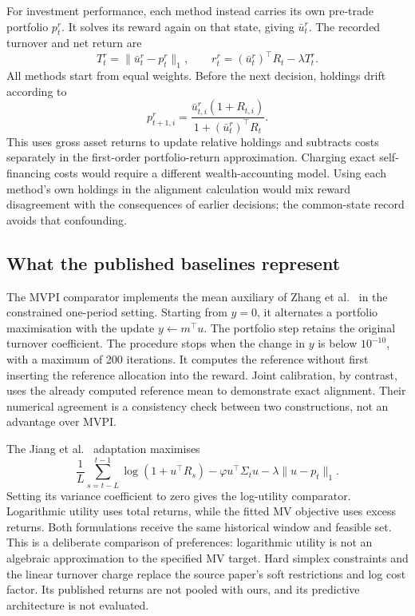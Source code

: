 \documentclass[sigconf,review]{acmart}
\begin{document}
For investment performance, each method instead carries its own pre-trade portfolio $p_t^r$. It solves its reward again on that state, giving $\bar u_t^r$. The recorded turnover and net return are
\begin{equation}
 T_t^r=\|\bar u_t^r-p_t^r\|_1,\qquad
 r_t^r=(\bar u_t^r)^\top R_t-\lambda T_t^r.
\end{equation}
All methods start from equal weights. Before the next decision, holdings drift according to
\begin{equation}
 p_{t+1,i}^r=
 \frac{\bar u_{t,i}^r(1+R_{t,i})}{1+(\bar u_t^r)^\top R_t}.
\end{equation}
This uses gross asset returns to update relative holdings and subtracts costs separately in the first-order portfolio-return approximation. Charging exact self-financing costs would require a different wealth-accounting model. Using each method's own holdings in the alignment calculation would mix reward disagreement with the consequences of earlier decisions; the common-state record avoids that confounding.

\subsection{What the published baselines represent}
The MVPI comparator implements the mean auxiliary of Zhang et al.\ \cite{zhang2021} in the constrained one-period setting. Starting from $y=0$, it alternates a portfolio maximisation with the update $y\leftarrow m^\top u$. The portfolio step retains the original turnover coefficient. The procedure stops when the change in $y$ is below $10^{-10}$, with a maximum of 200 iterations. It computes the reference without first inserting the reference allocation into the reward. Joint calibration, by contrast, uses the already computed reference mean to demonstrate exact alignment. Their numerical agreement is a consistency check between two constructions, not an advantage over MVPI.

The Jiang et al.\ \cite{jiang2025} adaptation maximises
\begin{equation}
 \frac1L\sum_{s=t-L}^{t-1}\log(1+u^\top R_s)
 -\varphi u^\top\Sigma_tu-\lambda\|u-p_t\|_1.
\end{equation}
Setting its variance coefficient to zero gives the log-utility comparator. Logarithmic utility uses total returns, while the fitted MV objective uses excess returns. Both formulations receive the same historical window and feasible set. This is a deliberate comparison of preferences: logarithmic utility is not an algebraic approximation to the specified MV target. Hard simplex constraints and the linear turnover charge replace the source paper's soft restrictions and log cost factor. Its published returns are not pooled with ours, and its predictive architecture is not evaluated.
\end{document}
